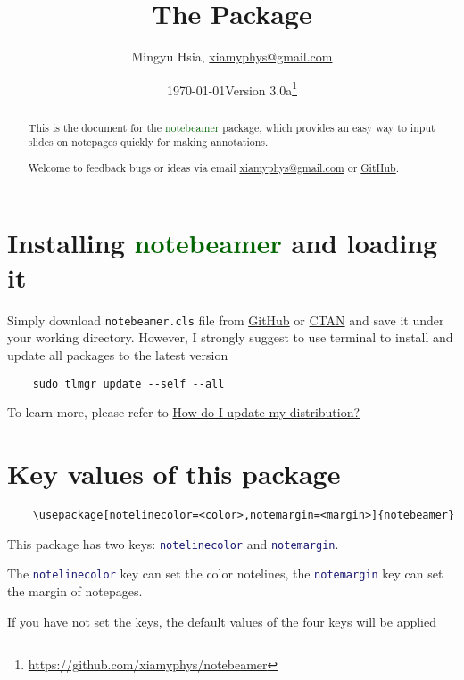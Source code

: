 \documentclass[11pt,svgnames]{article}
\title{\bfseries The \pkg{notebeamer} Package}
\author{Mingyu Hsia, \href{mailto:xiamyphys@gmail.com}{\ttfamily xiamyphys@gmail.com}}
\affil{Hangzhou Dianzi University}
\date{\today\quad Version 3.0a\thanks{\url{https://github.com/xiamyphys/notebeamer}}}
\def\pkg#1{\textcolor{DarkGreen}{\textsf{#1}}}
\def\cmd#1{\textcolor{MidnightBlue}{\texttt{\string#1}}}
\begin{document}
\maketitle

\begin{abstract}

This is the document for the \pkg{notebeamer} package, which provides an easy way to input slides on notepages quickly for making annotations.

Welcome to feedback bugs or ideas via email \href{mailto:xiamyphys@gmail.com}{\ttfamily xiamyphys@gmail.com} or \href{https://github.com/xiamyphys/fadingimage}{GitHub}.

\end{abstract}

\section{Installing \pkg{notebeamer} and loading it}

Simply download \verb|notebeamer.cls| file from \href{https://github.com/xiamyphys/notebeamer}{GitHub} or \href{https://ctan.org/pkg/fadingimage}{CTAN} and save it under your working directory. However, I strongly suggest to use terminal to install and update all packages to the latest version

\begin{verbatim}
    sudo tlmgr update --self --all
\end{verbatim}

To learn more, please refer to \href{https://tex.stackexchange.com/questions/55437/how-do-i-update-my-tex-distribution}{How do I update my  distribution?}

\section{Key values of this package}

\begin{verbatim}
    \usepackage[notelinecolor=<color>,notemargin=<margin>]{notebeamer}
\end{verbatim}

This package has two keys: \cmd{notelinecolor} and \cmd{notemargin}.

The \cmd{notelinecolor} key can set the color notelines, the \cmd{notemargin} key can set the margin of notepages.

If you have not set the keys, the default values of the four keys will be applied
\end{document}
